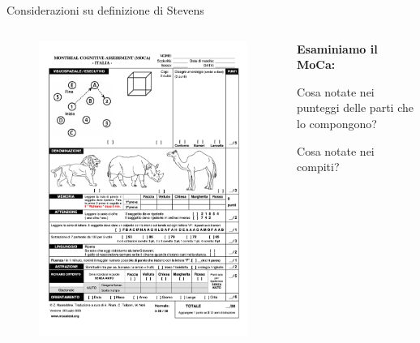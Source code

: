 \documentclass[
  ignorenonframetext,
]{beamer}
\begin{document}
\begin{frame}{Considerazioni su definizione di Stevens}
\label{considerazioni-su-definizione-di-stevens}
\begin{columns}
  \begin{column}{0.5\textwidth}
    \begin{figure}
    \includegraphics[scale=0.1]{Figures/MoCA-Test-Italian.png}
    \end{figure}
  \end{column}
  \begin{column}{0.5\textwidth}
    \textbf{Esaminiamo il MoCa:}
    \pause
    \vspace{2em}
    
    Cosa notate nei punteggi delle parti che lo compongono?
    
    \vspace{2em}
    Cosa notate nei compiti?
  \end{column}
\end{columns}
\end{frame}
\end{document}
